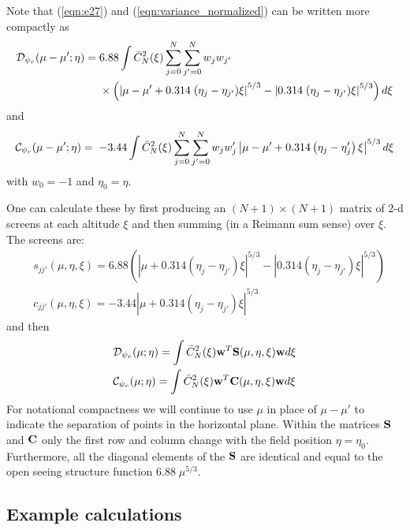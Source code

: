 \documentclass[11pt, oneside]{article}   	%
\begin{document}
Note that (\ref{eqn:e27}) and (\ref{eqn:variance_normalized}) can be written more compactly as
\begin{align}
{\cal D}_{\psi_r}(\mu - \mu'; \eta) = \;&6.88 \int \bar C_N^2 (\xi) \sum_{j=0}^N \sum_{j'=0}^N w_j w_{j'} \nonumber \\
&\times \left( \left |\mu-\mu' + 0.314\; (\eta_j - \eta_{j'})\xi\right|^{5/3} - \left |0.314\; (\eta_j - \eta_{j'})\xi\right|^{5/3} \right) d\xi
\end{align}
and
\begin{align}
{\cal C}_{\psi_r}(\mu-\mu';\eta) = \; -3.44 \int \bar C_N^2(\xi) \sum_{j=0}^N \sum_{j'=0}^N w_j w_j' 
\left| \mu-\mu'+0.314 \left( \eta_j - \eta_j' \right)\xi \right|^{5/3} d\xi
\end{align}
with $w_0 = -1$ and $\eta_0 = \eta$.

One can calculate these by first producing an $(N+1) \times (N+1)$ matrix of 2-d screens at each altitude $\xi$ and then summing (in a Reimann sum sense) over $\xi$. The screens are:
\begin{align}
&s_{jj'}(\mu,\eta,\xi) = 6.88 \left( \left |\mu + 0.314 (\eta_j-\eta_{j'})\xi\right|^{5/3} - \left |0.314 (\eta_j-\eta_{j'})\xi\right|^{5/3}\right) \\
&c_{{jj'}}(\mu, \eta,\xi) = -3.44 \left| \mu+0.314\left(\eta_j - \eta_{j'} \right)\xi \right|^{5/3} 
\end{align}
and then
\begin{align}
&{\cal D}_{\psi_r}(\mu;\eta) = \int \bar C_N^2(\xi) {\bf w}^T {\bf S}(\mu,\eta,\xi) {\bf w} d\xi  \label{eqn:quadratic_form_structure} \\
&{\cal C}_{\psi_r}(\mu;\eta) = \int \bar C_N^2(\xi) {\bf w}^T {\bf C}(\mu, \eta,\xi) {\bf w} d\xi \label{eqn:quadratic_form_correlation}
\end{align}
For notational compactness we will continue to use $\mu$ in place of $\mu-\mu'$ to indicate the separation of points in the horizontal plane. Within the matrices ${\bf S}$ and ${\bf C}$ only the first row and column change with the field position $\eta=\eta_0$. Furthermore, all the diagonal elements of the ${\bf S}$ are identical and equal to the open seeing structure function $6.88\; \mu^{5/3}$.

\subsection{Example calculations}
\end{document}
